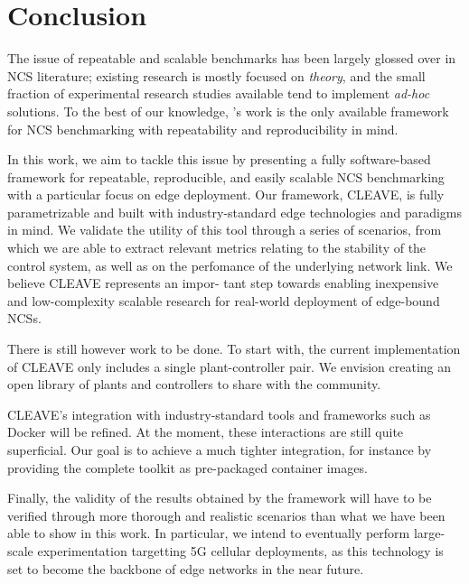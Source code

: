 \section{Conclusion}\label{sec:conclusion}

The issue of repeatable and scalable benchmarks has been largely glossed over in \ac{NCS} literature; existing research is mostly focused on \emph{theory}, and the small fraction of experimental research studies available tend to implement \emph{ad-hoc} solutions.
To the best of our knowledge, \textcite{Zoppi2020NCSBench}'s work is the only available framework for \ac{NCS} benchmarking with repeatability and reproducibility in mind.

In this work, we aim to tackle this issue by presenting a fully software-based framework for repeatable, reproducible, and easily scalable \ac{NCS} benchmarking with a particular focus on edge deployment.
Our framework, \ac{CLEAVE}, is fully parametrizable and built with industry-standard edge technologies and paradigms in mind.
We validate the utility of this tool through a series of scenarios, from which we are able to extract relevant metrics relating to the stability of the control system, as well as on the perfomance of the underlying network link.
We believe \ac{CLEAVE} represents an impor-
tant step towards enabling inexpensive and low-complexity
scalable research for real-world deployment of edge-bound \acp{NCS}.

There is still however work to be done.
To start with, the current implementation of \ac{CLEAVE} only includes a single plant-controller pair.
We envision creating an open library of plants and controllers to share with the community.

\ac{CLEAVE}'s integration with industry-standard tools and frameworks such as Docker will be refined.
At the moment, these interactions are still quite superficial.
Our goal is to achieve a much tighter integration, for instance by providing the complete toolkit as pre-packaged container images.

Finally, the validity of the results obtained by the framework will have to be verified through more thorough and realistic scenarios than what we have been able to show in this work.
In particular, we intend to eventually perform large-scale experimentation targetting 5G cellular deployments, as this technology is set to become the backbone of edge networks in the near future.

